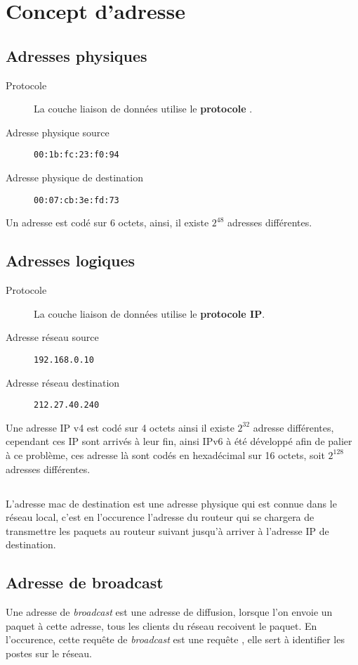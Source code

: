 \documentclass[a4paper, 11pt]{article}
\newcommand{\udp}{\bsc{udp}}
\newcommand{\mac}{\bsc{mac}}
\newcommand{\arp}{\bsc{ftp}}
\begin{document}
	\maketitle
	\section{Concept d'adresse}
	\subsection{Adresses physiques}
	
	\begin{description}
		\item[Protocole] La couche liaison de données utilise le \textbf{protocole \udp}.
		\item[Adresse physique source] \texttt{00:1b:fc:23:f0:94}
		\item[Adresse physique de destination] \texttt{00:07:cb:3e:fd:73}
	\end{description}
	Un adresse \mac{} est codé sur 6 octets, ainsi, il existe $2^{48}$ adresses \mac{} différentes.

	\subsection{Adresses logiques}
	\begin{description}
		\item[Protocole] La couche liaison de données utilise le \textbf{protocole IP}.
		\item[Adresse réseau source] \texttt{192.168.0.10}
		\item[Adresse réseau destination] \texttt{212.27.40.240}
	\end{description}
	Une adresse IP v4 est codé sur 4 octets ainsi il existe $2^{32}$ adresse différentes, cependant ces IP sont arrivés à leur fin, ainsi IPv6 à été
	développé afin de palier à ce problème, ces adresse là sont codés en hexadécimal sur 16 octets, soit $2^128$ adresses différentes.

	\subsection{}
		L'adresse mac de destination est une adresse physique qui est connue dans le réseau local, c'est en l'occurence l'adresse du routeur qui se
		chargera de transmettre les paquets au routeur suivant jusqu'à arriver à l'adresse IP de destination.

		\subsection{Adresse de broadcast} Une adresse de \textit{broadcast} est une adresse de diffusion, lorsque l'on envoie un paquet à cette adresse, tous les clients du
	 réseau recoivent le paquet. En l'occurence, cette requête de \textit{broadcast} est une requête \arp{}, elle sert à identifier les postes sur le réseau.
\end{document}
